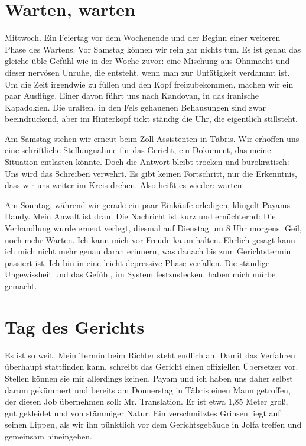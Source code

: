 \chapter*{Warten, warten}

Mittwoch. Ein Feiertag vor dem Wochenende und der Beginn einer weiteren Phase des Wartens. Vor Samstag können wir rein gar nichts tun. Es ist genau das gleiche üble Gefühl wie in der Woche zuvor: eine Mischung aus Ohnmacht und dieser nervösen Unruhe, die entsteht, wenn man zur Untätigkeit verdammt ist. Um die Zeit irgendwie zu füllen und den Kopf freizubekommen, machen wir ein paar Ausflüge. Einer davon führt uns nach Kandovan, in das iranische Kapadokien. Die uralten, in den Fels gehauenen Behausungen sind zwar beeindruckend, aber im Hinterkopf tickt ständig die Uhr, die eigentlich stillsteht.

Am Samstag stehen wir erneut beim Zoll-Assistenten in Täbris. Wir erhoffen uns eine schriftliche Stellungnahme für das Gericht, ein Dokument, das meine Situation entlasten könnte. Doch die Antwort bleibt trocken und bürokratisch: Uns wird das Schreiben verwehrt. Es gibt keinen Fortschritt, nur die Erkenntnis, dass wir uns weiter im Kreis drehen. Also heißt es wieder: warten.

Am Sonntag, während wir gerade ein paar Einkäufe erledigen, klingelt Payams Handy. Mein Anwalt ist dran. Die Nachricht ist kurz und ernüchternd: Die Verhandlung wurde erneut verlegt, diesmal auf Dienstag um 8 Uhr morgens. Geil, noch mehr Warten. Ich kann mich vor Freude kaum halten. Ehrlich gesagt kann ich mich nicht mehr genau daran erinnern, was danach bis zum Gerichtstermin passiert ist. Ich bin in eine leicht depressive Phase verfallen. Die ständige Ungewissheit und das Gefühl, im System festzustecken, haben mich mürbe gemacht.

\chapter*{Tag des Gerichts}

Es ist so weit. Mein Termin beim Richter steht endlich an. Damit das Verfahren überhaupt stattfinden kann, schreibt das Gericht einen offiziellen Übersetzer vor. Stellen können sie mir allerdings keinen. Payam und ich haben uns daher selbst darum gekümmert und bereits am Donnerstag in Täbris einen Mann getroffen, der diesen Job übernehmen soll: Mr. Translation. Er ist etwa 1,85 Meter groß, gut gekleidet und von stämmiger Natur. Ein verschmitztes Grinsen liegt auf seinen Lippen, als wir ihn pünktlich vor dem Gerichtsgebäude in Jolfa treffen und gemeinsam hineingehen.


